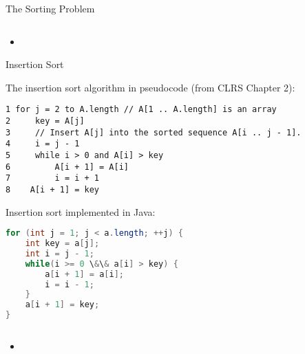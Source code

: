 \documentclass{beamer}
\begin{document}
\begin{frame}[fragile]{The Sorting Problem}


\begin{lstlisting}[language=Java]

\end{lstlisting}

\begin{itemize}
\item
\end{itemize}


\end{frame}


\begin{frame}[fragile]{Insertion Sort}


The insertion sort algorithm in pseudocode (from CLRS Chapter 2):
\vspace{-.05in}
\begin{lstlisting}[]
1 for j = 2 to A.length // A[1 .. A.length] is an array
2     key = A[j]
3     // Insert A[j] into the sorted sequence A[i .. j - 1].
4     i = j - 1
5     while i > 0 and A[i] > key
6         A[i + 1] = A[i]
7         i = i + 1
8    A[i + 1] = key
\end{lstlisting}

Insertion sort implemented in Java:
\vspace{-.05in}
\begin{lstlisting}[language=Java]
for (int j = 1; j < a.length; ++j) {
    int key = a[j];
    int i = j - 1;
    while(i >= 0 \&\& a[i] > key) {
        a[i + 1] = a[i];
        i = i - 1;
    }
    a[i + 1] = key;
}
\end{lstlisting}

\end{frame}


\begin{frame}[fragile]{}


\begin{lstlisting}[language=Java]

\end{lstlisting}

\begin{itemize}
\item
\end{itemize}


\end{frame}
\end{document}

